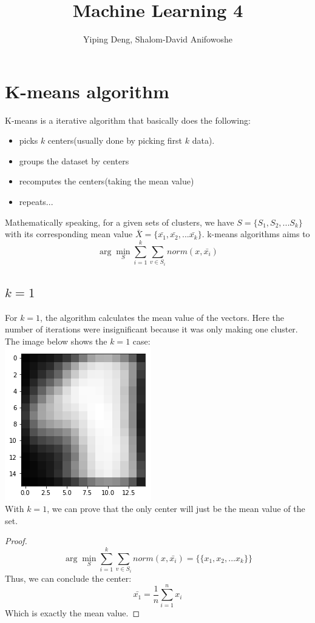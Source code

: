 \documentclass{article}
\newcommand{\hwnumber}{4}
\begin{document}
\title{Machine Learning \hwnumber}
\author{Yiping Deng, Shalom-David Anifowoshe}
\maketitle
\thispagestyle{fancy}
\section{K-means algorithm}
K-means is a iterative algorithm that basically does the following:
\begin{itemize}
    \item picks $k$ centers(usually done by picking first $k$ data).
    \item groups the dataset by centers
    \item recomputes the centers(taking the mean value)
    \item repeats...
\end{itemize}
Mathematically speaking, for a given sets of clusters,
we have
$ S = \{S_1, S_2, ... S_k\} $ with its corresponding mean 
value $ \bar{X} = \{\bar{x_1}, \bar{x_2}, ... \bar{x_k}\}$. k-means algorithms aims to
$$ \arg\min_{S} \sum_{i = 1}^{k} \sum_{v \in S_i} norm(x, \bar{x_i}) $$
\subsection{$k = 1$}
For $k = 1$, the algorithm calculates the mean value of the vectors. Here the number of iterations were insignificant because it was only making one cluster.  The image below shows the $k  = 1$ case: \\
\includegraphics{k_1.png} \\
With $k = 1$, we can prove that the only center will just be the mean value of the set.\\
\begin{proof}
$$ \arg\min_{S} \sum_{i = 1}^{k} \sum_{v \in S_i} norm(x, \bar{x_i}) = \{\{x_1, x_2, ... x_k\}\}$$
Thus, we can conclude the center:
$$ \bar{x_1} = \frac{1}{n} \sum_{i = 1}^{n} x_i $$
Which is exactly the mean value.
\end{proof}
\end{document}
